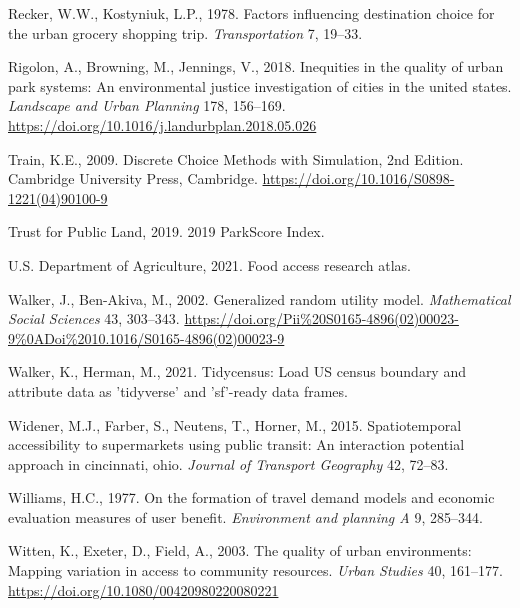 \documentclass[3p, authoryear, review]{elsarticle} %
\newlength{\cslhangindent}
\newenvironment{CSLReferences}[2] %
 {%
  \setlength{\parindent}{0pt}
  \ifodd #1 \everypar{\setlength{\hangindent}{\cslhangindent}}\ignorespaces\fi
  \ifnum #2 > 0
  \setlength{\parskip}{#2\baselineskip}
  \fi
 }%
 {}
\begin{document}
\begin{CSLReferences}{1}{0}
\leavevmode{}%
Recker, W.W., Kostyniuk, L.P., 1978. Factors influencing destination choice for the urban grocery shopping trip. \emph{Transportation} 7, 19--33.

\leavevmode{}%
Rigolon, A., Browning, M., Jennings, V., 2018. Inequities in the quality of urban park systems: An environmental justice investigation of cities in the united states. \emph{Landscape and Urban Planning} 178, 156--169. \url{https://doi.org/10.1016/j.landurbplan.2018.05.026}

\leavevmode{}%
Train, K.E., 2009. {Discrete Choice Methods with Simulation, 2nd Edition}. Cambridge University Press, Cambridge. \url{https://doi.org/10.1016/S0898-1221(04)90100-9}

\leavevmode{}%
Trust for Public Land, 2019. {2019 ParkScore Index}.

\leavevmode{}%
U.S. Department of Agriculture, 2021. Food access research atlas.

\leavevmode{}%
Walker, J., Ben-Akiva, M., 2002. Generalized random utility model. \emph{Mathematical Social Sciences} 43, 303--343. \url{https://doi.org/Pii\%20S0165-4896(02)00023-9\%0ADoi\%2010.1016/S0165-4896(02)00023-9}

\leavevmode{}%
Walker, K., Herman, M., 2021. Tidycensus: Load US census boundary and attribute data as 'tidyverse' and 'sf'-ready data frames.

\leavevmode{}%
Widener, M.J., Farber, S., Neutens, T., Horner, M., 2015. Spatiotemporal accessibility to supermarkets using public transit: An interaction potential approach in cincinnati, ohio. \emph{Journal of Transport Geography} 42, 72--83.

\leavevmode{}%
Williams, H.C., 1977. On the formation of travel demand models and economic evaluation measures of user benefit. \emph{Environment and planning A} 9, 285--344.

\leavevmode{}%
Witten, K., Exeter, D., Field, A., 2003. The quality of urban environments: Mapping variation in access to community resources. \emph{Urban Studies} 40, 161--177. \url{https://doi.org/10.1080/00420980220080221}


\end{CSLReferences}
\end{document}
